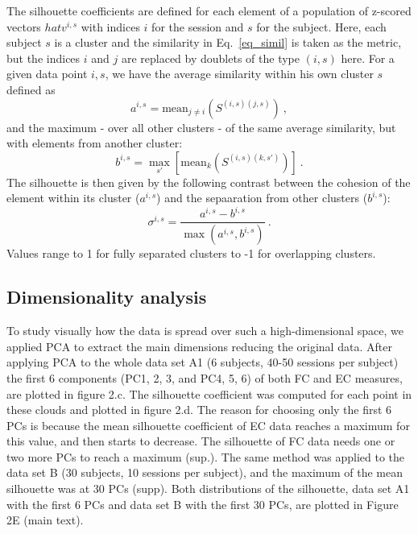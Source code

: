 \documentclass{article}
\begin{document}
The silhouette coefficients are defined for each element of a population of z-scored vectors $hat{v}^{i,s}$ with indices $i$ for the session and $s$ for the subject.
Here, each subject $s$ is a cluster and the similarity in Eq.~\eqref{eq_simil} is taken as the metric, but the indices $i$ and $j$ are replaced by doublets of the type $(i,s)$ here.
For a given data point ${i,s}$, we have the average similarity within his own cluster $s$ defined as
\begin{equation}
a^{i,s} = \mathrm{mean}_{j \neq i}(S^{(i,s)(j,s)})
\ ,
\end{equation}
and the maximum - over all other clusters - of the same average similarity, but with elements from another cluster:
\begin{equation}
b^{i,s} =  \max_{s'}[\mathrm{mean}_{k}(S^{(i,s)(k,s')})]
\ .
\end{equation}
The silhouette is then given by the following contrast between the cohesion of the element within its cluster ($a^{i,s}$) and the sepaaration from other clusters ($b^{i,s}$):
\begin{equation}
\sigma^{i,s} = \frac{a^{i,s} - b^{i,s}}{\max(a^{i,s},b^{i,s})}
\ .
\end{equation}
Values range to 1 for fully separated clusters to -1 for overlapping clusters.

\subsection{Dimensionality analysis}

To study visually how the data is spread over such a high-dimensional space, we applied PCA to extract the main dimensions reducing the original data. After applying PCA to the whole data set A1 (6 subjects, 40-50 sessions per subject) the first 6 components (PC1, 2, 3, and PC4, 5, 6) of both FC and EC measures, are plotted in figure 2.c. The silhouette coefficient was computed for each point in these clouds and plotted in figure 2.d. The reason for choosing only the first 6 PCs is because the mean silhouette coefficient of EC data reaches a maximum for this value, and then starts to decrease. The silhouette of FC data needs one or two more PCs to reach a maximum (sup.). The same method was applied to the data set B (30 subjects, 10 sessions per subject), and the maximum of the mean silhouette was at 30 PCs (supp). Both distributions of the silhouette, data set A1 with the first 6 PCs and data set B with the first 30 PCs, are plotted in Figure 2E (main text).
\end{document}
